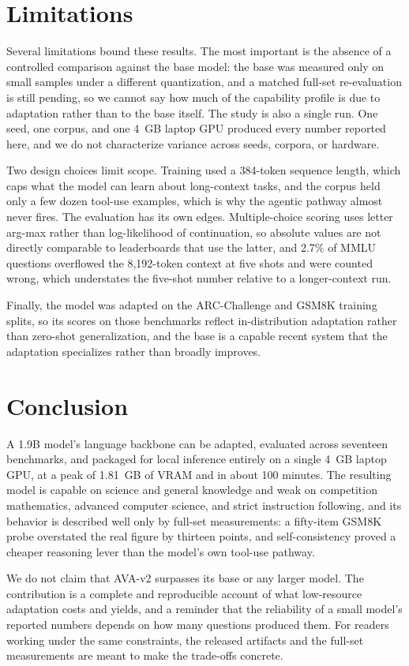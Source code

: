 \section{Limitations}

Several limitations bound these results. The most important is the absence of a controlled comparison against the base model: the base was measured only on small samples under a different quantization, and a matched full-set re-evaluation is still pending, so we cannot say how much of the capability profile is due to adaptation rather than to the base itself. The study is also a single run. One seed, one corpus, and one 4~GB laptop GPU produced every number reported here, and we do not characterize variance across seeds, corpora, or hardware.

Two design choices limit scope. Training used a 384-token sequence length, which caps what the model can learn about long-context tasks, and the corpus held only a few dozen tool-use examples, which is why the agentic pathway almost never fires. The evaluation has its own edges. Multiple-choice scoring uses letter arg-max rather than log-likelihood of continuation, so absolute values are not directly comparable to leaderboards that use the latter, and 2.7\% of MMLU questions overflowed the 8{,}192-token context at five shots and were counted wrong, which understates the five-shot number relative to a longer-context run.

Finally, the model was adapted on the ARC-Challenge and GSM8K training splits, so its scores on those benchmarks reflect in-distribution adaptation rather than zero-shot generalization, and the base is a capable recent system that the adaptation specializes rather than broadly improves.

\section{Conclusion}

A 1.9B model's language backbone can be adapted, evaluated across seventeen benchmarks, and packaged for local inference entirely on a single 4~GB laptop GPU, at a peak of 1.81~GB of VRAM and in about 100 minutes. The resulting model is capable on science and general knowledge and weak on competition mathematics, advanced computer science, and strict instruction following, and its behavior is described well only by full-set measurements: a fifty-item GSM8K probe overstated the real figure by thirteen points, and self-consistency proved a cheaper reasoning lever than the model's own tool-use pathway.

We do not claim that AVA-v2 surpasses its base or any larger model. The contribution is a complete and reproducible account of what low-resource adaptation costs and yields, and a reminder that the reliability of a small model's reported numbers depends on how many questions produced them. For readers working under the same constraints, the released artifacts and the full-set measurements are meant to make the trade-offs concrete.
